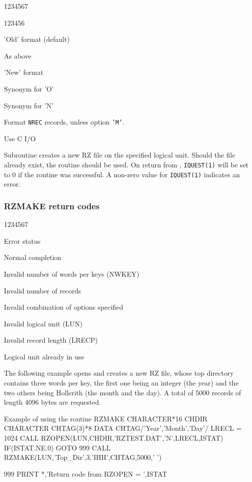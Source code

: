\begin{DLtt}{1234567}
\begin{DLtt}{123456}
\begin{DLtt}{12}
\item[' ']'Old' format (default)
\item['O']As above
\item['N']'New' format
\item['4']Synonym for 'O'
\item['7']Synonym for 'N'
\end{DLtt}
\item[{\rm other}]
\begin{DLtt}{12}
\item['F']Format {\tt NREC} records, unless option {\tt'M'}.
\item['C']Use C I/O
\end{DLtt}
\end{DLtt}
\end{DLtt}

Subroutine  creates a new RZ file on the specified
logical unit. Should the file already exist, the routine
 should be used.
On return from , {\tt IQUEST(1)}
will be set to 0
if the routine was successful. A non-zero value for
{\tt IQUEST(1)} indicates an error.

\subsubsection*{RZMAKE return codes}
\begin{DLtt}{1234567}
\item[IQUEST(1)]Error status
\begin{DLtt}{1}
\item[0]Normal completion
\item[1]Invalid number of words per keys (NWKEY)
\item[2]Invalid number of records
\item[3]Invalid combination of options specified
\item[4]Invalid logical unit (LUN)
\item[5]Invalid record length (LRECP)
\item[6]Logical unit already in use
\end{DLtt}
\end{DLtt}

The following example opens and creates a new RZ file,
whose top directory contains
three words per key, the first one being an integer (the year) and the
two others being Hollerith (the month and the day).
A total of 5000 records of length 4096 bytes are requested.
\enlargethispage{\baselineskip}
\begin{XMPt}{Example of using the routine RZMAKE}
      CHARACTER*16 CHDIR
      CHARACTER    CHTAG(3)*8
      DATA CHTAG/'Year','Month','Day'/
      LRECL = 1024
      CALL RZOPEN(LUN,CHDIR,'RZTEST.DAT','N',LRECL,ISTAT)
      IF(ISTAT.NE.0) GOTO 999
      CALL RZMAKE(LUN,'Top_Dir',3,'IHH',CHTAG,5000,' ')
 
  999 PRINT *,'Return code from RZOPEN = ',ISTAT
\end{XMPt}

